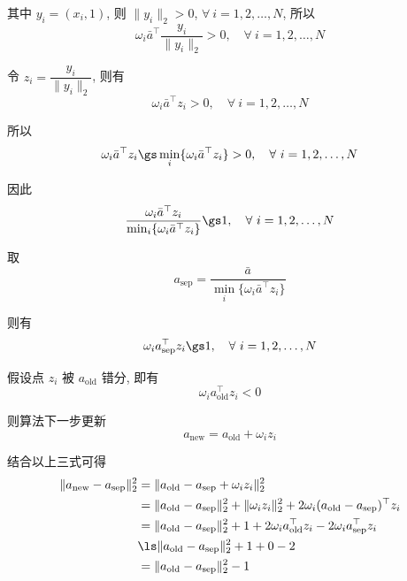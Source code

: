 \documentclass[openany]{ctexbook}
\theoremstyle{kaiti}
\theoremstyle{normal}
\begin{document}
其中 $y_i=(x_i,1)$, 则 $\|y_i\|_2>0$, $\forall~i=1,2,\dots,N$, 所以
\begin{equation}
  \omega_i\bar{a}^{\top}\frac{y_i}{\|y_i\|_2}>0,\quad \forall~i=1,2,\dots,N
\end{equation}

令 $z_i=\dfrac{y_i}{\|y_i\|_2}$, 则有
\begin{equation}
  \omega_i\bar{a}^{\top}z_i>0,\quad \forall~i=1,2,\dots,N
\end{equation}

所以
\begin{equation}
  \omega_i\bar{a}^{\top}z_i\gs\min_{i}\{\omega_i\bar{a}^{\top}z_i\}>0,\quad \forall~i=1,2,\dots,N
\end{equation}

因此
\begin{equation}
  \frac{\omega_i\bar{a}^{\top}z_i}{\min_{i}\{\omega_i\bar{a}^{\top}z_i\}}\gs1,\quad \forall~i=1,2,\dots,N
\end{equation}

取
\begin{equation*}
  a_{\mathrm{sep}}=\frac{\bar{a}}{\min_{i}\{\omega_i\bar{a}^{\top}z_i\}}
\end{equation*}

则有
\begin{equation}
  \omega_ia_{\mathrm{sep}}^{\top}z_i\gs1,\quad \forall~i=1,2,\dots,N
\end{equation}

假设点 $z_i$ 被 $a_{\mathrm{old}}$ 错分, 即有
\begin{equation}
  \omega_ia_{\mathrm{old}}^{\top}z_i<0
\end{equation}

则算法下一步更新
\begin{equation}
  a_{\mathrm{new}} = a_{\mathrm{old}}+\omega_iz_i
\end{equation}

结合以上三式可得
\begin{equation}
  \begin{aligned}
    \|a_{\mathrm{new}}-a_{\mathrm{sep}}\|_2^2
    &=\|a_{\mathrm{old}}-a_{\mathrm{sep}}+\omega_iz_i\|_2^2\\
    &=\|a_{\mathrm{old}}-a_{\mathrm{sep}}\|_2^2+\|\omega_iz_i\|_2^2+2\omega_i(a_{\mathrm{old}}-a_{\mathrm{sep}})^{\top}z_i\\
    &=\|a_{\mathrm{old}}-a_{\mathrm{sep}}\|_2^2+1+2\omega_ia_{\mathrm{old}}^{\top}z_i-2\omega_ia_{\mathrm{sep}}^{\top}z_i\\
    &\ls\|a_{\mathrm{old}}-a_{\mathrm{sep}}\|_2^2+1+0-2\\
    &=\|a_{\mathrm{old}}-a_{\mathrm{sep}}\|_2^2-1
  \end{aligned}
\end{equation}
\end{document}
